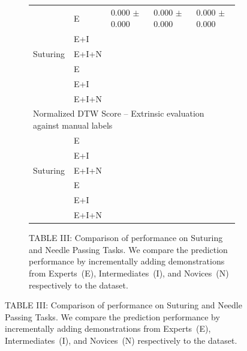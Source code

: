 \documentclass[0-main.tex]{subfiles}
\begin{document}
\begin{figure}[t!]
\begin{subfigure}[t]{2.65in}
{\begin{tabular}{ll|l|l|l}
            \cellcolor[HTML]{CBCEFB}                                 & E     & 0.000 $\pm$ 0.000 &  0.000 $\pm$ 0.000   & 0.000 $\pm$ 0.000  \\ 
            \rowcolor[HTML]{E0E0E0}
            \cellcolor[HTML]{CBCEFB}                                 & E+I   & &    &  \\ 
            \multirow{-3}{*}{\cellcolor[HTML]{CBCEFB}Suturing}       & E+I+N & &    &  \\ 
            \rowcolor[HTML]{E0E0E0}
            \cellcolor[HTML]{FFC72C}                                 & E     & &    &  \\ 
            \cellcolor[HTML]{FFC72C}                                 & E+I   & &    &  \\ 
            \rowcolor[HTML]{E0E0E0}
            \multirow{-3}{*}{\cellcolor[HTML]{FFC72C}\parbox{1.2cm}{Needle Passing}} & E+I+N & &    &  \\ \hline \hline
            \multicolumn{5}{l}{\cellcolor[HTML]{FFC72C}Normalized DTW Score -- Extrinsic evaluation against manual labels} \\ 
            \cellcolor[HTML]{CBCEFB}                                 & E     & &    &  \\ 
            \rowcolor[HTML]{E0E0E0}
            \cellcolor[HTML]{CBCEFB}                                 & E+I   & &    &  \\ 
            \multirow{-3}{*}{\cellcolor[HTML]{CBCEFB}Suturing}       & E+I+N & &    &  \\ 
            \rowcolor[HTML]{E0E0E0}
            \cellcolor[HTML]{FFC72C}                                 & E     & &    &  \\ 
            \cellcolor[HTML]{FFC72C}                                 & E+I   & &    &  \\ 
            \rowcolor[HTML]{E0E0E0}
            \multirow{-3}{*}{\cellcolor[HTML]{FFC72C}\parbox{1.2cm}{Needle Passing}} & E+I+N & &    &  \\ \hline
            \end{tabular}
        }
        \caption*{TABLE III: Comparison of \TSC performance on Suturing and Needle Passing Tasks. We compare the prediction performance by incrementally adding demonstrations from Experts~(E), Intermediates~(I), and Novices~(N) respectively to the dataset. \label{tab:jigsaws}}
        \vspace{-15pt}
        \par\vspace{0pt}

\end{subfigure}
\end{figure}
\end{document}
